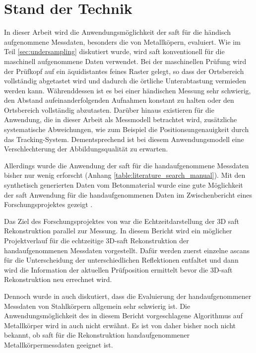 \chapter{Stand der Technik} \label{chap:soa}

In dieser Arbeit wird die Anwendungsmöglichkeit der \acrshort{saft} für die händisch aufgenommene Messdaten, besonders die von Metallköpern, evaluiert. Wie im Teil \ref{sec:undersampling} diskutiert wurde, wird \acrshort{saft} konventionell für die maschinell aufgenommene Daten verwendet. Bei der maschinellen Prüfung wird der Prüfkopf auf ein äquidistantes feines Raster gelegt, so dass der Ortsbereich vollständig abgetastet wird und dadurch die örtliche Unterabtastung vermieden werden kann. Währenddessen ist es bei einer händischen Messung sehr schwierig, den Abstand aufeinanderfolgenden Aufnahmen konstant zu halten oder den Ortsbereich vollständig abzutasten. Darüber hinaus existieren für die Anwendung, die in dieser Arbeit als Messmodell betrachtet wird, zusätzliche systematische Abweichungen, wie zum Beispiel die Positionsungenauigkeit durch das Tracking-System.  Dementsprechend ist bei diesem Anwendungsmodell eine Verschlechterung der Abbildungsqualität zu erwarten. \par

Allerdings wurde die Anwendung der \acrshort{saft} für die handaufgenommene Messdaten bisher nur wenig erforscht (Anhang \ref{table:literature_search_manual}). Mit den synthetisch generierten Daten vom Betonmaterial wurde eine gute Möglichkeit der \acrshort{saft} Anwendung für die handaufgenommenen Daten im Zwischenbericht eines Forschungsprojektes gezeigt \cite{Mayer16SAFTwithSmallData}. \par
Das Ziel des Forschungsprojektes von \cite{Mayer16SAFTwithSmallData} war die Echtzeitdarstellung der 3D \acrshort{saft} Rekonstruktion parallel zur Messung. In diesem Bericht wird ein möglicher Projektverlauf für die echtzeitige 3D-\acrshort{saft} Rekonstruktion der handaufgenommenen Messdaten vorgestellt. Dafür werden zuerst einzelne \gls{ascan}s für die Unterscheidung der unterschiedlichen Reflektionen entfaltet und dann wird die Information der aktuellen Prüfposition ermittelt bevor die 3D-\acrshort{saft} Rekonstruktion neu errechnet wird. \par
Dennoch wurde in \cite{Mayer16SAFTwithSmallData} auch diskutiert, dass die Evaluierung der handaufgenommener Messdaten von Stahlkörpern allgemein sehr schwierig ist. Die Anwendungsmöglichkeit des in diesem Bericht vorgeschlagene Algorithmus auf Metallkörper wird in \cite{Mayer16SAFTwithSmallData} auch nicht erwähnt. Es ist von daher bisher noch nicht bekannt, ob \acrshort{saft} für die Rekonstruktion  handaufgenommener Metallkörpermessdaten geeignet ist.



